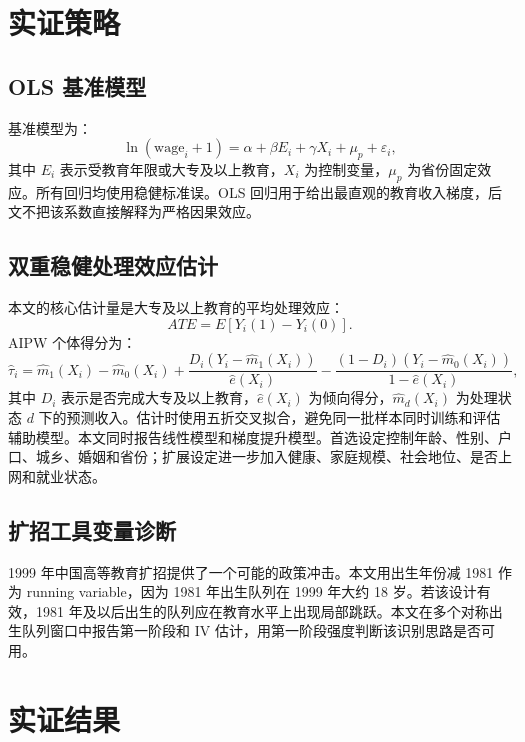 \documentclass[UTF8,12pt]{ctexart}
\begin{document}
\section{实证策略}

\subsection{OLS 基准模型}

基准模型为：
\begin{equation}
\ln(\mathrm{wage}_i+1)=\alpha+\beta E_i+\gamma X_i+\mu_p+\varepsilon_i,
\end{equation}
其中 $E_i$ 表示受教育年限或大专及以上教育，$X_i$ 为控制变量，$\mu_p$ 为省份固定效应。所有回归均使用稳健标准误。OLS 回归用于给出最直观的教育收入梯度，后文不把该系数直接解释为严格因果效应。

\subsection{双重稳健处理效应估计}

本文的核心估计量是大专及以上教育的平均处理效应：
\begin{equation}
ATE=E[Y_i(1)-Y_i(0)].
\end{equation}
AIPW 个体得分为：
\begin{equation}
\hat{\tau}_i =
\hat{m}_1(X_i)-\hat{m}_0(X_i)
+\frac{D_i(Y_i-\hat{m}_1(X_i))}{\hat{e}(X_i)}
-\frac{(1-D_i)(Y_i-\hat{m}_0(X_i))}{1-\hat{e}(X_i)},
\end{equation}
其中 $D_i$ 表示是否完成大专及以上教育，$\hat{e}(X_i)$ 为倾向得分，$\hat{m}_d(X_i)$ 为处理状态 $d$ 下的预测收入。估计时使用五折交叉拟合，避免同一批样本同时训练和评估辅助模型。本文同时报告线性模型和梯度提升模型。首选设定控制年龄、性别、户口、城乡、婚姻和省份；扩展设定进一步加入健康、家庭规模、社会地位、是否上网和就业状态。

\subsection{扩招工具变量诊断}

1999 年中国高等教育扩招提供了一个可能的政策冲击。本文用出生年份减 1981 作为 running variable，因为 1981 年出生队列在 1999 年大约 18 岁。若该设计有效，1981 年及以后出生的队列应在教育水平上出现局部跳跃。本文在多个对称出生队列窗口中报告第一阶段和 IV 估计，用第一阶段强度判断该识别思路是否可用。

\section{实证结果}
\end{document}
